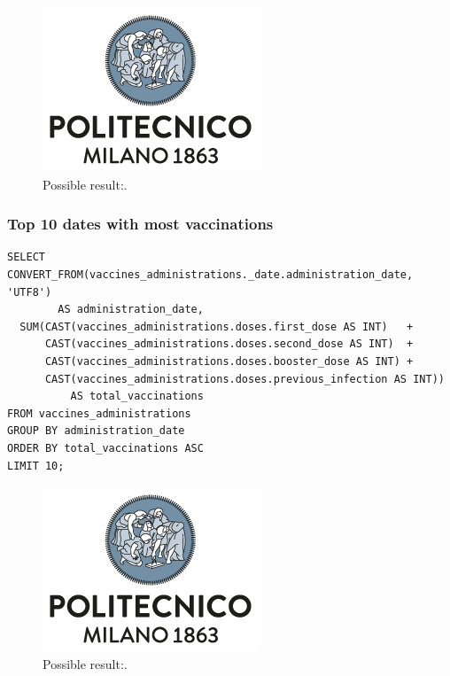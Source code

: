 \documentclass[12pt, a4paper]{article}
\begin{document}
\noindent
\begin{figure}[ht]
  \centering
  \includegraphics[width=.6\linewidth]{polimi.png}
  \caption*{Possible result:.} %
\end{figure}

\subsubsection{Top 10 dates with most vaccinations}

\begin{tcolorbox}[fontupper=\scriptsize]
  \begin{verbatim}
SELECT CONVERT_FROM(vaccines_administrations._date.administration_date, 'UTF8') 
        AS administration_date,
  SUM(CAST(vaccines_administrations.doses.first_dose AS INT)   + 
      CAST(vaccines_administrations.doses.second_dose AS INT)  + 
      CAST(vaccines_administrations.doses.booster_dose AS INT) +
      CAST(vaccines_administrations.doses.previous_infection AS INT)) 
          AS total_vaccinations
FROM vaccines_administrations
GROUP BY administration_date
ORDER BY total_vaccinations ASC
LIMIT 10;
  \end{verbatim}
\end{tcolorbox}

\noindent
\begin{figure}[ht]
  \centering
  \includegraphics[width=.6\linewidth]{polimi.png}
  \caption*{Possible result:.} %
\end{figure}
\end{document}
